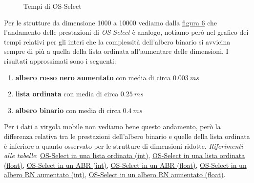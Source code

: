\documentclass[onecolumn]{article}
\begin{document}
\begin{figure}[H]
	\caption{Tempi di OS-Select}
	\label{fig:os-select-m}
\end{figure}

Per le strutture da dimensione 1000 a 10000 vediamo dalla \hyperref[fig:os-select-m]{figura 6} che l'andamento delle prestazioni di \textit{OS-Select} è analogo, notiamo però nel grafico dei tempi relativi per gli interi che la complessità dell'albero binario si avvicina sempre di più a quella della lista ordinata all'aumentare delle dimensioni. I risultati approssimati sono i seguenti:

\begin{enumerate}
    \item \textbf{albero rosso nero aumentato} con media di circa \(0.003\:ms\)
    \item \textbf{lista ordinata} con media di circa \(0.25\:ms\)
    \item \textbf{albero binario} con media di circa \(0.4\:ms\)
\end{enumerate}

Per i dati a virgola mobile non vediamo bene questo andamento, però la differenza relativa tra le prestazioni dell'albero binario e quelle della lista ordinata è inferiore a quanto osservato per le strutture di dimensioni ridotte. 
\newline
\textit{Riferimenti alle tabelle}: \hyperref[label:lista-ordinata-m-os-select]{OS-Select in una lista ordinata (int)}, \hyperref[label:lista-ordinata-m-float-os-select]{OS-Select in una lista ordinata (float)}, \hyperref[label:abr-m-os-select]{OS-Select in un ABR (int)}, \hyperref[label:abr-m-float-os-select]{OS-Select in un ABR (float)}, \hyperref[label:rn-aumentato-m-os-select]{OS-Select in un albero RN aumentato (int)}, \hyperref[label:rn-aumentato-m-float-os-select]{OS-Select in un albero RN aumentato (float)}.
\end{document}
